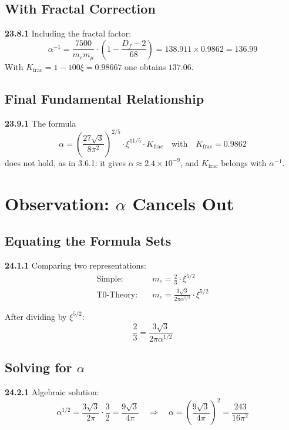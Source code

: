 \subsection{With Fractal Correction}

\noindent \textbf{23.8.1} Including the fractal factor:
\[
\alpha^{-1} = \frac{7500}{m_e m_\mu} \cdot \left(1 - \frac{D_f - 2}{68}\right) = 138.911 \times 0.9862 = 136.99
\]
With $K_{\text{frac}} = 1-100\xi = 0.98667$ one obtains $137.06$.

\subsection{Final Fundamental Relationship}

\noindent \textbf{23.9.1} The formula
\[
	\alpha = \left(\frac{27\sqrt{3}}{8\pi^2}\right)^{2/5} \cdot \xi^{11/5} \cdot K_{\text{frac}}
\quad \text{with} \quad K_{\text{frac}} = 0.9862
\]
does not hold, as in 3.6.1: it gives $\alpha \approx 2.4\times10^{-9}$, and $K_{\text{frac}}$ belongs with $\alpha^{-1}$.	


\section{Observation: $\alpha$ Cancels Out}

\subsection{Equating the Formula Sets}

\noindent \textbf{24.1.1} Comparing two representations:
\begin{align*}
	\text{Simple:} &\quad m_e = \frac{2}{3} \cdot \xi^{5/2} \\
	\text{T0-Theory:} &\quad m_e = \frac{3\sqrt{3}}{2\pi\alpha^{1/2}} \cdot \xi^{5/2}
\end{align*}

After dividing by $\xi^{5/2}$:
\[
\frac{2}{3} = \frac{3\sqrt{3}}{2\pi\alpha^{1/2}}
\]

\subsection{Solving for $\alpha$}

\noindent \textbf{24.2.1} Algebraic solution:
\[
\alpha^{1/2} = \frac{3\sqrt{3}}{2\pi} \cdot \frac{3}{2} = \frac{9\sqrt{3}}{4\pi}
\quad \Rightarrow \quad
\alpha = \left(\frac{9\sqrt{3}}{4\pi}\right)^2 = \frac{243}{16\pi^2}
\]

